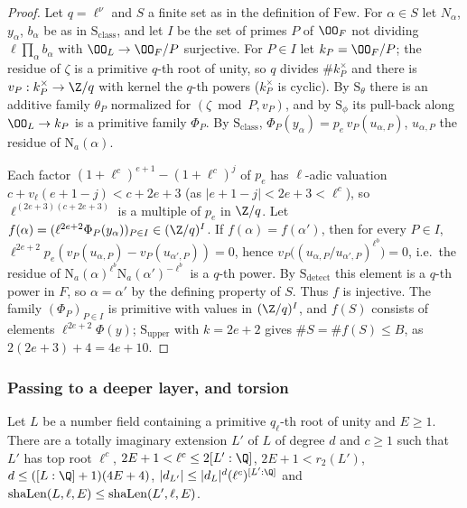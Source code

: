 \begin{proof}
Let $q=\ell^\nu$ and $S$ a finite set as in the definition of $\mathrm{Few}$. For $\alpha\in S$ let $N_\alpha$, $y_\alpha$, $b_\alpha$ be as in
$\mathrm S_{\mathrm{class}}$, and let $I$ be the set of primes $P$ of $\OO_F$ not dividing $\ell\prod_\alpha b_\alpha$ with $\OO_L\to\OO_F/P$
surjective. For $P\in I$ let $k_P=\OO_F/P$; the residue of $\zeta$ is a primitive $q$-th root of unity, so $q$ divides $\#k_P^\times$ and there
is $v_P:k_P^\times\to\Z/q$ with kernel the $q$-th powers ($k_P^\times$ is cyclic). By $\mathrm S_\theta$ there is an additive family $\theta_P$ normalized
for $(\zeta\bmod P,v_P)$, and by $\mathrm S_\phi$ its pull-back along $\OO_L\to k_P$ is a primitive family $\Phi_P$. By $\mathrm S_{\mathrm{class}}$,
$\Phi_P(y_\alpha)=p_e\,v_P(u_{\alpha,P})$, $u_{\alpha,P}$ the residue of $\mathrm N_a(\alpha)$.

Each factor $(1+\ell^c)^{e+1}-(1+\ell^c)^j$ of $p_e$ has $\ell$-adic valuation $c+v_\ell(e+1-j)<c+2e+3$ (as $|e+1-j|<2e+3<\ell^c$), so
$\ell^{(2e+3)(c+2e+3)}$ is a multiple of $p_e$ in $\Z/q$. Let $f(\alpha)=(\ell^{2e+2}\Phi_P(y_\alpha))_{P\in I}\in(\Z/q)^I$. If $f(\alpha)=f(\alpha')$,
then for every $P\in I$, $\ell^{2e+2}p_e(v_P(u_{\alpha,P})-v_P(u_{\alpha',P}))=0$, hence $v_P\bigl((u_{\alpha,P}/u_{\alpha',P})^{\ell^b}\bigr)=0$, i.e.\ the
residue of $\mathrm N_a(\alpha)^{\ell^b}\mathrm N_a(\alpha')^{-\ell^b}$ is a $q$-th power. By $\mathrm S_{\mathrm{detect}}$ this element is a $q$-th power
in $F$, so $\alpha=\alpha'$ by the defining property of $S$. Thus $f$ is injective. The family $(\Phi_P)_{P\in I}$ is primitive with values in
$(\Z/q)^I$, and $f(S)$ consists of elements $\ell^{2e+2}\Phi(y)$; $\mathrm S_{\mathrm{upper}}$ with $k=2e+2$ gives $\#S=\#f(S)\le B$, as
$2(2e+3)+4=4e+10$.
\end{proof}

\subsubsection{Passing to a deeper layer, and torsion}

\begin{proposition}\label{pf:vwin:slayer}
Let $L$ be a number field containing a primitive $q_\ell$-th root of unity and $E\ge1$. There are a totally imaginary extension $L'$ of $L$ of
degree $d$ and $c\ge1$ such that $L'$ has top root $\ell^c$, $2E+1<\ell^c\le2[L':\Q]$, $2E+1<r_2(L')$, $d\le([L:\Q]+1)(4E+4)$,
$|d_{L'}|\le|d_L|^d(\ell^c)^{[L':\Q]}$ and $\mathrm{shaLen}(L,\ell,E)\le\mathrm{shaLen}(L',\ell,E)$.
\end{proposition}

